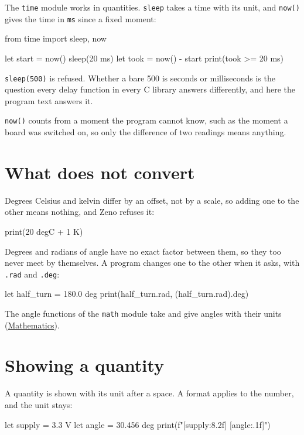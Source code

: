 The \verb|time| module works in quantities. \verb|sleep| takes a
time with its unit, and \verb|now()| gives the time in \verb|ms|
since a fixed moment:

\begin{zeno}
from time import sleep, now

let start = now()
sleep(20 ms)
let took = now() - start
print(took >= 20 ms)
\end{zeno}

\verb|sleep(500)| is refused. Whether a bare 500 is seconds or
milliseconds is the question every delay function in every C library
answers differently, and here the program text answers it.

\verb|now()| counts from a moment the program cannot know, such as the
moment a board was switched on, so only the difference of two readings
means anything.

\section{What does not convert}

Degrees Celsius and kelvin differ by an offset, not by a scale, so
adding one to the other means nothing, and Zeno refuses it:

\begin{zeno}[fails=yes]
print(20 degC + 1 K)
\end{zeno}

Degrees and radians of angle have no exact factor between them, so
they too never meet by themselves. A program changes one to the other
when it asks, with \verb|.rad| and \verb|.deg|:

\begin{zeno}
let half_turn = 180.0 deg
print(half_turn.rad, (half_turn.rad).deg)
\end{zeno}

The angle functions of the \verb|math| module take and give angles
with their units (\hyperref[ch-math]{Mathematics}).

\section{Showing a quantity}

A quantity is shown with its unit after a space. A format applies to
the number, and the unit stays:

\begin{zeno}
let supply = 3.3 V
let angle = 30.456 deg
print(f"[{supply:8.2f}] [{angle:.1f}]")
\end{zeno}

